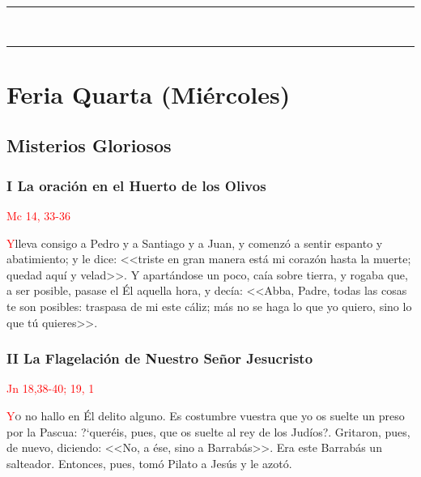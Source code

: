 \documentclass[10pt,twoside]{book}
\begin{document}
\begin{center}
      \begin{spacing}{0.25}
            {\rule{20em}{0.4pt}}\\
            {\rule{20em}{0.4pt}}
      \end{spacing}
\end{center}


\section*{\centering Feria Quarta (Miércoles)}

\noindent\subsection*{Misterios Gloriosos}

\noindent\subsubsection*{I La oración en el Huerto de los Olivos}

\vspace{-0.5em}

\hfill\textcolor{red}{Mc 14, 33-36}

\lettrine[lines=2]{\textcolor{red}{Y}}\space lleva consigo a Pedro y a Santiago y a Juan, y comenzó a sentir espanto y abatimiento; y le dice: <<triste en gran manera está mi corazón hasta la muerte;
quedad aquí y velad>>. Y apartándose un poco, caía sobre tierra, y rogaba que, a ser posible, pasase el Él aquella hora, y decía: <<Abba, Padre, todas las cosas te son posibles:
traspasa de mi este cáliz; más no se haga lo que yo quiero, sino lo que tú quieres>>.

\vspace{0.5em}



\noindent\subsubsection*{II La Flagelación de Nuestro Señor Jesucristo}

\vspace{-0.5em}

\hfill\textcolor{red}{Jn 18,38-40; 19, 1}

\lettrine[lines=2, ante=\guillemotleft]{\textcolor{red}{Y}}o no hallo en Él delito alguno. Es costumbre vuestra que yo os suelte un preso por la Pascua: {?`}queréis, 
pues, que os suelte al rey de los Judíos?\guillemotright. Gritaron, pues, de nuevo, diciendo: <<No, a ése, sino a Barrabás>>. 
Era este Barrabás un salteador. Entonces, pues, tomó Pilato a Jesús y le azotó.
\end{document}
